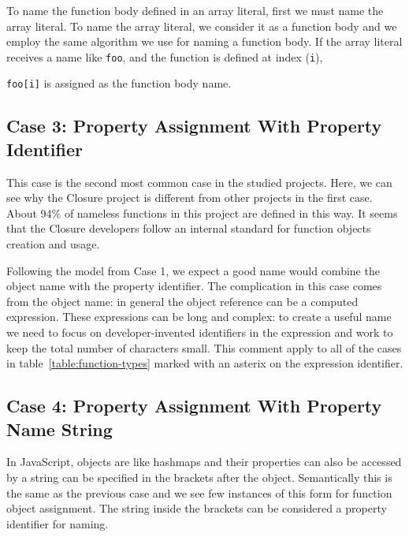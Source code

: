 \documentclass[10pt, preprint]{sigplanconf}
\begin{document}
To name the function body defined in an array literal, first we must name the array literal. To name the array literal, we consider it as a function body and we employ the same algorithm we use for naming a function body. If the array literal receives a name like {\small\texttt{foo}}, and the function is defined at index ({\small\texttt{i}}), {{\small\texttt{foo[i]}} is assigned as the function body name. 


\subsection{Case 3: Property Assignment With Property Identifier }
This case is the second most common case in the studied projects. Here, we can see why the Closure project is different from other projects in the first case. About 94\% of nameless functions in this project are defined in this way. It seems that the Closure developers follow an internal standard for function objects creation and usage.

Following the model from Case 1, we expect a good name would combine the object name with the property identifier. The complication in this case comes from the object name: in general the object reference can be a computed expression. These expressions can be long and complex: to create a useful name we need to focus on developer-invented identifiers in the expression and work to keep the total number of characters small.  This comment apply to all of the cases in table~\ref{table:function-types} marked with an asterix on the expression identifier.

\subsection{Case 4: Property Assignment With  Property Name String}
In JavaScript, objects are like hashmaps and their properties can also be accessed by a string can be specified in the brackets after the object. Semantically this is the same as the previous case and we see few instances of this form for function object assignment. The string inside the brackets can be considered a property identifier for naming.

}
\end{document}
